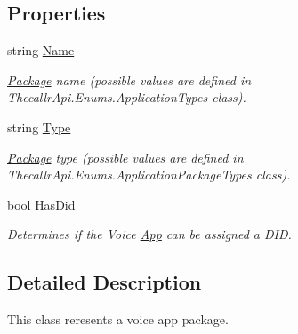 \subsection*{Properties}
\begin{DoxyCompactItemize}
\item 
string \hyperlink{class_thecallr_api_1_1_objects_1_1_app_1_1_package_a4366fa87c76002ac7d586a021313f8f6}{Name}
\begin{DoxyCompactList}\small\item\em \hyperlink{class_thecallr_api_1_1_objects_1_1_app_1_1_package}{Package} name (possible values are defined in Thecallr\+Api.\+Enums.\+Application\+Types class). \end{DoxyCompactList}\item 
string \hyperlink{class_thecallr_api_1_1_objects_1_1_app_1_1_package_a63a019eaced5637657eb6482738e4537}{Type}
\begin{DoxyCompactList}\small\item\em \hyperlink{class_thecallr_api_1_1_objects_1_1_app_1_1_package}{Package} type (possible values are defined in Thecallr\+Api.\+Enums.\+Application\+Package\+Types class). \end{DoxyCompactList}\item 
bool \hyperlink{class_thecallr_api_1_1_objects_1_1_app_1_1_package_ac9476ed81b6fe1253a0a78344c0fbfa9}{Has\+Did}
\begin{DoxyCompactList}\small\item\em Determines if the Voice \hyperlink{class_thecallr_api_1_1_objects_1_1_app_1_1_app}{App} can be assigned a D\+I\+D. \end{DoxyCompactList}\end{DoxyCompactItemize}


\subsection{Detailed Description}
This class reresents a voice app package. 



